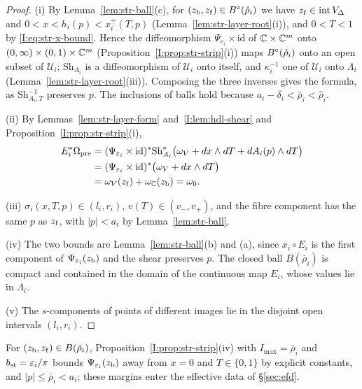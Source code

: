\begin{proof}
(i) By Lemma~\ref{lem:str-ball}(c), for $(z_{\rm b},z_{\rm f})\in B^{\circ}(\hat\rho_i)$ we have $z_{\rm f}\in\operatorname{int}V_\Delta$ and
$0<x<h_i(p)<x_i^+(T,p)$ (Lemma~\ref{lem:str-layer-root}(i)), and $0<T<1$ by \eqref{I:eq:str-x-bound}. Hence the
diffeomorphism $\Psi_{\varepsilon_i}\times\mathrm{id}$ of $\mathbb{C}\times\mathbb{C}^m$ onto $(0,\infty)\times(0,1)\times\mathbb{C}^m$
(Proposition~\ref{I:prop:str-strip}(i)) maps $B^{\circ}(\hat\rho_i)$ onto an open subset of $\mathcal U_i$; $\mathrm{Sh}_{A_i}$ is a
diffeomorphism of $\mathcal U_i$ onto itself, and $\kappa_i^{-1}$ one of $\mathcal U_i$ onto $\Lambda_i$
(Lemma~\ref{lem:str-layer-root}(iii)). Composing the three inverses gives the formula, as $\mathrm{Sh}_{A_i,T}^{-1}$ preserves $p$.
The inclusions of balls hold because $a_i-\delta_i<\bar\rho_i<\hat\rho_i$.

(ii) By Lemmas~\ref{lem:str-layer-form} and~\ref{I:lem:hdl-shear} and Proposition~\ref{I:prop:str-strip}(i),
\begin{align*}
 E_i^*\Omega_{\rm pre}
 &=(\Psi_{\varepsilon_i}\times\mathrm{id})^*\mathrm{Sh}_{A_i}^*
      \big(\omega_V+dx\wedge dT+dA_i(p)\wedge dT\big)\\
 &=(\Psi_{\varepsilon_i}\times\mathrm{id})^*\big(\omega_V+dx\wedge dT\big)\\
 &=\omega_V(z_{\rm f})+\omega_{\mathbb{C}}(z_{\rm b})=\omega_0 .
\end{align*}

(iii) $\sigma_i(x,T,p)\in(l_i,r_i)$, $v(T)\in(v_-,v_+)$, and the fibre component has the same $p$ as $z_{\rm f}$, with $|p|<a_i$
by Lemma~\ref{lem:str-ball}.

(iv) The two bounds are Lemma~\ref{lem:str-ball}(b) and (a), since $x_i\circ E_i$ is the first component of
$\Psi_{\varepsilon_i}(z_{\rm b})$ and the shear preserves $p$. The closed ball $B(\bar\rho_i)$ is compact and contained in the domain of
the continuous map $E_i$, whose values lie in $\Lambda_i$.

(v) The $s$-components of points of different images lie in the disjoint open intervals $(l_i,r_i)$.
\end{proof}

For $(z_{\rm b},z_{\rm f})\in B(\bar\rho_i)$, Proposition~\ref{I:prop:str-strip}(iv) with $I_{\max}=\bar\rho_i$ and
$b_{\rm st}=\varepsilon_i/\pi$ bounds $\Psi_{\varepsilon_i}(z_{\rm b})$ away from $x=0$ and $T\in\{0,1\}$ by explicit constants, and
$|p|\le\bar\rho_i<a_i$; these margins enter the effective data of \S\ref{sec:efd}.

